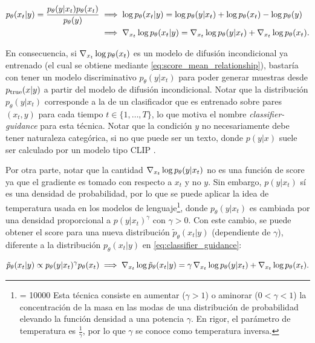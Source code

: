 \begin{align}
    p_\theta(x_t|y) = \frac{p_\theta(y|x_t)p_\theta(x_t)}{p_\theta(y)} &\implies \log p_\theta(x_t|y) = \log p_\theta(y|x_t) + \log p_\theta(x_t) - \log p_\theta(y)\nonumber\\
    &\implies \nabla_{x_t} \log p_\theta(x_t|y) = \nabla_{x_t} \log p_\theta(y|x_t) + \nabla_{x_t} \log p_\theta(x_t)\label{eq:classifier_guidance} .
\end{align}

En consecuencia, si $\nabla_{x_t} \log p_\theta(x_t)$ es un modelo de difusión incondicional ya entrenado (el cual se obtiene mediante \eqref{eq:score_mean_relationship}), bastaría con tener un modelo discriminativo $p_\theta(y|x_t)$ para poder generar muestras desde $p_{\operatorname{true}}(x|y)$ a partir del modelo de difusión incondicional. Notar que la distribución $p_\theta(y|x_t)$ corresponde a la de un clasificador que es entrenado sobre pares $(x_t,y)$ para cada tiempo $t\in\{1,\ldots,T\}$, lo que motiva el nombre \textit{classifier-guidance} para esta técnica. Notar que la condición $y$ no necesariamente debe tener naturaleza categórica, si no que puede ser un texto, donde $p(y|x)$ suele ser calculado por un modelo tipo CLIP \cite{radford2021learningtransferablevisualmodels}.

Por otra parte, notar que la cantidad $\nabla_{x_t} \log p_\theta(y|x_t)$ no es una función de score ya que el gradiente es tomado con respecto a $x_t$ y no $y$. Sin embargo, $p(y|x_t)$ sí es una densidad de probabilidad, por lo que se puede aplicar la idea de temperatura usada en los modelos de lenguaje\footnote{\interlinepenalty = 10000 Esta técnica consiste en aumentar ($\gamma>1$) o aminorar ($0<\gamma<1$) la concentración de la masa en las modas de una distribución de probabilidad elevando la función densidad a una potencia $\gamma$. En rigor, el parámetro de temperatura es $\frac{1}{\gamma}$, por lo que $\gamma$ se conoce como temperatura inversa.}, donde $p_\theta(y|x_t)$ es cambiada por una densidad proporcional a $p(y|x_t)^\gamma$ con $\gamma>0$. Con este cambio, se puede obtener el score para una nueva distribución $\tilde{p}_\theta(x_t|y)$ (dependiente de $\gamma$), diferente a la distribución $p_\theta(x_t|y)$ en \eqref{eq:classifier_guidance}:

\begin{equation}
    \label{eq:guidance_temperature}
    \tilde{p}_\theta(x_t|y) \propto p_\theta(y|x_t)^\gamma p_\theta(x_t)
    \implies
    \nabla_{x_t} \log \tilde{p}_\theta(x_t|y) = \gamma\,\nabla_{x_t} \log p_\theta(y|x_t) + \nabla_{x_t} \log p_\theta(x_t).
\end{equation}

